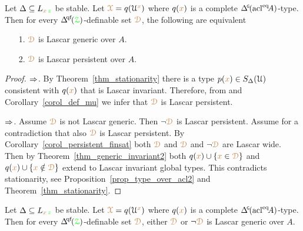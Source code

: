 
\begin{proposition}\label{prop_stable_genericiffpersistent}
  Let $\Delta\subseteq L_{{\color{brown} x}\,{\color{green} z}}$ be stable.
  Let ${\color{brown}\EuScript X}=q(\EuScript U^{\color{brown} x})$ where $q({\color{brown} x})$ is a complete $\GDelta(\acl^\eq\!A)$-type.
  Then for every $\qfDelta(\grZ)$-definable set ${\color{brown}\EuScript D}$, the following are equivalent
  \begin{itemize}
    \item[1.] ${\color{brown}\EuScript D}$ is Lascar generic over $A$.
    \item[2.] ${\color{brown}\EuScript D}$ is Lascar persistent over $A$.
  \end{itemize}
\end{proposition}

\begin{proof}
  $\Rightarrow$.
  By Theorem~\ref{thm_stationarity} there is a type $p({\color{brown} x})\in S_\Delta(\EuScript U)$ consistent with $q({\color{brown} x})$ that is Lascar invariant.
  Therefore, from  and Corollary~\ref{corol_def_mu} we infer that ${\color{brown}\EuScript D}$ is Lascar persistent.

  $\Rightarrow$.
  Assume ${\color{brown}\EuScript D}$ is not Lascar generic.
  Then $\neg{\color{brown}\EuScript D}$ is Lascar persistent.
  Assume for a contradiction that also ${\color{brown}\EuScript D}$ is Lascar persistent.
  By Corollary~\ref{corol_persistent_finsat} both ${\color{brown}\EuScript D}$ and ${\color{brown}\EuScript D}$ and $\neg{\color{brown}\EuScript D}$ are Lascar wide.
  Then by Theorem~\ref{thm_generic_invariant2} both $q({\color{brown} x})\cup\{{\color{brown} x}\in{\color{brown}\EuScript D}\}$ and $q({\color{brown} x})\cup\{{\color{brown} x}\notin{\color{brown}\EuScript D}\}$ extend to Lascar invariant global types.
  This contradicts stationarity, see Proposition~\ref{prop_type_over_acl2} and Theorem~\ref{thm_stationarity}.
\end{proof}

\begin{corollary}\label{corol_stable_generic}
  Let $\Delta\subseteq L_{{\color{brown} x}\,{\color{green} z}}$ be stable.
  Let ${\color{brown}\EuScript X}=q(\EuScript U^{\color{brown} x})$ where $q({\color{brown} x})$ is a complete $\GDelta(\acl^\eq\!A)$-type.
  Then for every $\qfDelta(\grZ)$-definable set ${\color{brown}\EuScript D}$, either ${\color{brown}\EuScript D}$ or $\neg{\color{brown}\EuScript D}$ is Lascar generic over $A$.
\end{corollary}

